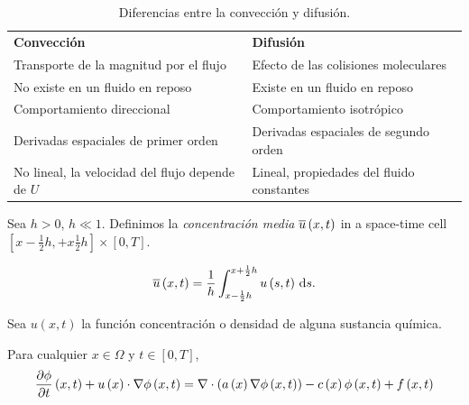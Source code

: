 \begin{table}[ht!]
    \centering
    \begin{tabular}{ll}
        \textbf{Convección}                              &
        \textbf{Difusión}                                  \\
        Transporte de la magnitud por el flujo           &
        Efecto de las colisiones moleculares               \\
        \hline
        No existe en un fluido en reposo                 &
        Existe en un fluido en reposo                      \\
        \hline
        Comportamiento direccional                       &
        Comportamiento isotrópico                          \\
        \hline
        Derivadas espaciales de primer orden             &
        Derivadas espaciales de segundo orden              \\
        \hline
        No lineal, la velocidad del flujo depende de $U$ &
        Lineal, propiedades del fluido constantes
    \end{tabular}
    \caption[short]{Diferencias entre la convección y difusión.}
\end{table}

\begin{definition}
    Sea $h>0$, $h\ll 1$.
    Definimos la \emph{concentración media}
    \begin{math}
        \overline{u}\left(x,t\right)
    \end{math}
    in a space-time cell
    \begin{math}
        \left[
            x-\frac{1}{2}h,
            +x\frac{1}{2}h
            \right]
        \times
        \left[
            0,T
            \right]
    \end{math}.

    \begin{equation*}
        \averageconcentration=
        \dfrac{1}{h}
        \int_{x-\frac{1}{2}h}^{x+\frac{1}{2}h}
        u
        \left(
        s,t
        \right)
        \dl s.
    \end{equation*}
\end{definition}

Sea
\begin{math}
    u\left(x,t\right)
\end{math}
la función concentración o densidad de alguna sustancia química.

\begin{definition}
    Para cualquier $x\in\Omega$ y $t\in\left[0,T\right]$,
    \begin{equation}\label{eq:advecion-difussion-reaction}
        \diffp{\phi}{t}\left(x,t\right)+
        u\left(x\right)\cdot
        \nabla\phi\left(x,t\right)=
        \nabla\cdot\left(a\left(x\right)\nabla\phi\left(x,t\right)\right)-
        c\left(x\right)\phi\left(x,t\right)
        +f\left(x,t\right)
    \end{equation}
\end{definition}

